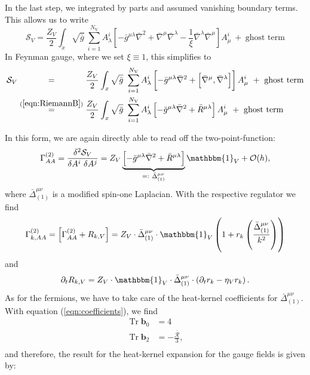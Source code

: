 In the last step, we integrated by parts and assumed vanishing boundary terms.\\
 This allows us to write 
\begin{equation}
\mathcal{S}_V = \frac{Z_{V}}{2} \int_x \sqrt{\bar{g}} \ \sum\limits_{i=1}^{N_{\text{V}}} A_{\lambda}^{i}\left[ - \bar{g}^{\mu\lambda}\bar{\nabla}^2 +  \bar{\nabla}^{\mu}\bar{\nabla}^{\lambda} - \frac{1}{\xi} \bar{\nabla}^{\lambda}\bar{\nabla}^{\mu}\right]A_{\mu}^{i} \ + \ \text{ghost term}
\end{equation}
In Feynman gauge, where we set $\xi \equiv 1$, this simplifies to
\begin{equation}
\begin{aligned}
\mathcal{S}_V &\overset{\phantom{(\mathrm{\ref{eqn:RiemannB}})}}{=} \frac{Z_{V}}{2} \int_x \sqrt{\bar{g}} \ \sum\limits_{i=1}^{N_{\text{V}}} A_{\lambda}^{i}\left[ - \bar{g}^{\mu\lambda}\bar{\nabla}^2 +  \left[\bar{\nabla}^{\mu}, \bar{\nabla}^{\lambda}\right]\right]A_{\mu}^{i} \ + \ \text{ghost term} \\
&\overset{(\mathrm{\ref{eqn:RiemannB}})}{=} \frac{Z_{V}}{2} \int_x \sqrt{\bar{g}} \ \sum\limits_{i=1}^{N_{\text{V}}} A_{\lambda}^{i}\left[ - \bar{g}^{\mu\lambda}\bar{\nabla}^2 +  \bar{R}^{\mu\lambda}\right]A_{\mu}^{i} \ + \ \text{ghost term}
\end{aligned}
\end{equation}

In this form, we are again directly able to read off the two-point-function:
\begin{equation}
	\Gamma^{(2)}_{AA} = \frac{\delta^2 \mathcal{S}_V}{\delta A^{i}\ \delta A^{j}} = Z_V\underbrace{\left[ - \bar{g}^{\mu\lambda}\bar{\nabla}^2 +  \bar{R}^{\mu\lambda}\right]}_{=: \  \bar{\Delta}^{\mu\nu}_{(1)}}\mathbbm{1}_V + \mathcal{O}(h),
\end{equation} 
where $\bar{\Delta}^{\mu\nu}_{(1)}$ is a modified spin-one Laplacian. With the respective regulator we find
\begin{align}
	\Gamma^{(2)}_{k, AA} = \left[\Gamma^{(2)}_{AA}+ R_{k, V}\right]  = Z_V \cdot\bar{\Delta}_{(1)}^{\mu\nu}\cdot\mathbbm{1}_V\left(1 + r_k\left(\frac{\bar{\Delta}_{(1)}^{\mu\nu}}{k^2}\right)\right)
\end{align}
and 
\begin{align}
	\partial_t R_{k, V} = Z_V\cdot\mathbbm{1}_V\cdot\bar{\Delta}_{(1)}^{\mu\nu}\cdot\left(\partial_t r_k - \eta_V r_k\right).
\end{align}
As for the fermions, we have to take care of the heat-kernel coefficients for $\bar{\Delta}^{\mu\nu}_{(1)}$. With equation (\ref{eqn:coefficients}), we find 
\begin{equation}
\begin{aligned}
	\operatorname{Tr}\mathbf{b}_0 &= 4 \\
	\operatorname{Tr}\mathbf{b}_2 &= -\frac{\bar{\mathcal{R}}}{3}, \\
\end{aligned} 
\end{equation}
and therefore, the result for the heat-kernel expansion for the gauge fields is given by:

